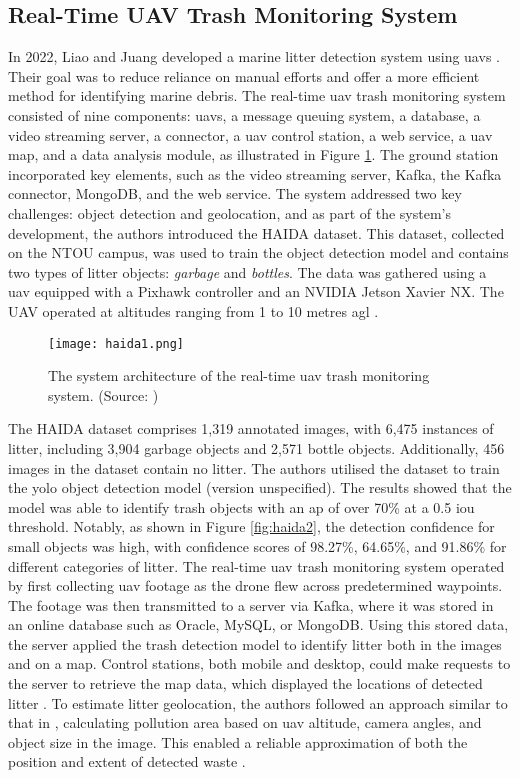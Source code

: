 \subsection{Real-Time UAV Trash Monitoring System}
\label{subsec:3_haida}

In 2022, Liao and Juang developed a marine litter detection system using \gls{uav}s \cite{haida}. Their goal was to reduce reliance on manual efforts and offer a more efficient method for identifying marine debris. The real-time \gls{uav} trash monitoring system consisted of nine components: \gls{uav}s, a message queuing system, a database, a video streaming server, a connector, a \gls{uav} control station, a web service, a \gls{uav} map, and a data analysis module, as illustrated in Figure \ref{fig:haida1}. The ground station incorporated key elements, such as the video streaming server, Kafka, the Kafka connector, MongoDB, and the web service. The system addressed two key challenges: object detection and geolocation, and as part of the system's development, the authors introduced the HAIDA dataset. This dataset, collected on the NTOU campus, was used to train the object detection model and contains two types of litter objects: \textit{garbage} and \textit{bottles}. The data was gathered using a \gls{uav} equipped with a Pixhawk controller and an NVIDIA Jetson Xavier NX. The UAV operated at altitudes ranging from 1 to 10 metres \gls{agl} \cite{haida}.

\begin{figure}[!htbp]
    \centering
    \texttt{[image: haida1.png]}
    \caption{The system architecture of the real-time \gls{uav} trash monitoring system. (Source: \cite{haida})}
    \label{fig:haida1}
\end{figure}

The HAIDA dataset comprises 1,319 annotated images, with 6,475 instances of litter, including 3,904 garbage objects and 2,571 bottle objects. Additionally, 456 images in the dataset contain no litter. The authors utilised the dataset to train the \gls{yolo} object detection model (version unspecified). The results showed that the model was able to identify trash objects with an \gls{ap} of over 70\% at a 0.5 \gls{iou} threshold. Notably, as shown in Figure \ref{fig:haida2}, the detection confidence for small objects was high, with confidence scores of 98.27\%, 64.65\%, and 91.86\% for different categories of litter.
The real-time \gls{uav} trash monitoring system operated by first collecting \gls{uav} footage as the drone flew across predetermined waypoints. The footage was then transmitted to a server via Kafka, where it was stored in an online database such as Oracle, MySQL, or MongoDB. Using this stored data, the server applied the trash detection model to identify litter both in the images and on a map. Control stations, both mobile and desktop, could make requests to the server to retrieve the map data, which displayed the locations of detected litter \cite{haida}.
To estimate litter geolocation, the authors followed an approach similar to that in \cite{uavvaste}, calculating pollution area based on \gls{uav} altitude, camera angles, and object size in the image. This enabled a reliable approximation of both the position and extent of detected waste \cite{haida}.

